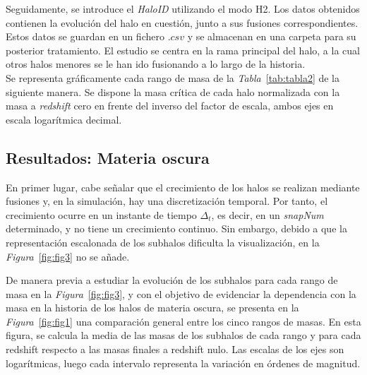 Seguidamente, se introduce el \textit{HaloID} utilizando el modo H2. Los datos obtenidos contienen la evolución del halo en cuestión, junto a sus fusiones correspondientes. Estos datos se guardan en un fichero $.csv$ y se almacenan en una carpeta para su posterior tratamiento. El estudio se centra en la rama principal del halo, a la cual otros halos menores se le han ido fusionando a lo largo de la historia. \\

Se representa gráficamente cada rango de masa de la \textit{Tabla}~\ref{tab:tabla2} de la siguiente manera. Se dispone la masa crítica de cada halo normalizada con la masa a \textit{redshift} cero en frente del inverso del factor de escala, ambos ejes en escala logarítmica decimal. 

\subsection{Resultados: Materia oscura}
\label{subsec:2_B}

En primer lugar, cabe señalar que el crecimiento de los halos se realizan mediante fusiones y, en la simulación, hay una discretización temporal. Por tanto, el crecimiento ocurre en un instante de tiempo $\Delta_t$, es decir, en un \textit{snapNum} determinado, y no tiene un crecimiento continuo. Sin embargo, debido a que la representación escalonada de los subhalos dificulta la visualización, en la \textit{Figura}~\ref{fig:fig3} no se añade. \\

\begin{comment}
El objetivo de mostrar la dependencia con la masa en la historia de los halos de materia oscura, se ha presentado la \textit{Figura}~\ref{fig:fig1} a modo de comparación de las medias de los halos pertenecientes a cada intervalo de masas
\end{comment}

De manera previa a estudiar la evolución de los subhalos para cada rango de masa en la \textit{Figura}~\ref{fig:fig3}, y con el objetivo de evidenciar la dependencia con la masa en la historia de los halos de materia oscura, se presenta en la \textit{Figura}~\ref{fig:fig1} una comparación general entre los cinco rangos de masas. En esta figura, se calcula la media de las masas de los subhalos de cada rango y para cada redshift respecto a las masas finales a redshift nulo. Las escalas de los ejes son logarítmicas, luego cada intervalo representa la variación en órdenes de magnitud. \\

